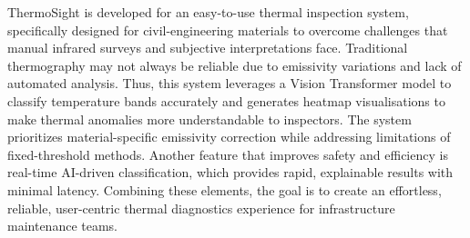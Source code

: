 \noindent ThermoSight is developed for an easy-to-use thermal inspection system, specifically designed for civil-engineering materials to overcome challenges that manual infrared surveys and subjective interpretations face. Traditional thermography may not always be reliable due to emissivity variations and lack of automated analysis. Thus, this system leverages a Vision Transformer model to classify temperature bands accurately and generates heatmap visualisations to make thermal anomalies more understandable to inspectors. The system prioritizes material-specific emissivity correction while addressing limitations of fixed-threshold methods. Another feature that improves safety and efficiency is real-time AI-driven classification, which provides rapid, explainable results with minimal latency. Combining these elements, the goal is to create an effortless, reliable, user-centric thermal diagnostics experience for infrastructure maintenance teams.
